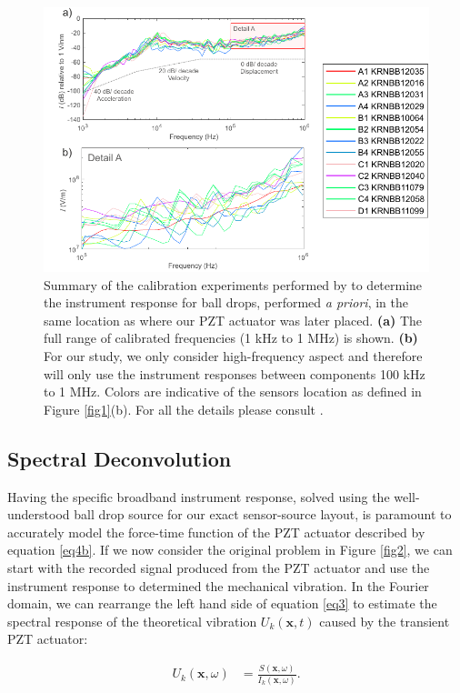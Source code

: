 \documentclass[preprint,3p, 11pt,authoryear]{elsarticle}
\begin{document}
\begin{figure}[ht]
     	\centering
\includegraphics[scale= 1.0]{FIG6.pdf} 
\caption{Summary of the calibration experiments performed by \citet{Wu} to determine the instrument response for ball drops, performed \textit{a priori}, in the same location as where our PZT actuator was later placed. \textbf{(a)} The full range of calibrated frequencies (1 kHz to 1 MHz) is shown. \textbf{(b)} For our study, we only consider high-frequency aspect and therefore will only use the instrument responses between components 100 kHz to 1 MHz.  Colors are indicative of the sensors location as defined in Figure \ref{fig1}(b). For all the details please consult \citet{Wu}. }
	\label{fig6} 
\end{figure}

\subsection{Spectral Deconvolution}
\label{Spec_deconv}
Having the specific broadband instrument response, solved using the well-understood ball drop source for our exact sensor-source layout, is paramount to accurately model the force-time function of the PZT actuator described by equation \eqref{eq4b}.   If we now consider the original problem in Figure \ref{fig2}, we can start with the recorded signal produced from the PZT actuator and use the instrument response to determined the mechanical vibration.  In the Fourier domain, we can rearrange the left hand side of equation \eqref{eq3} to estimate the spectral response of the theoretical vibration $U_{k}(\mathbf{x},t)$ caused by the transient PZT actuator:

\begin{equation}
    \label{eq6}
\begin{split}
U_{k}\left( \mathbf{x}, \omega \right) & = 
        \frac{S\left( \mathbf{x}, \omega \right) }{ I_{k}\left( \mathbf{x},\omega \right)}.
\end{split}
\end{equation}
\end{document}
